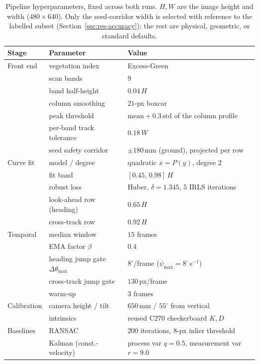 {\renewcommand{\arraystretch}{1.15}
\begin{table}[!ht]
  \centering
  \caption{Pipeline hyperparameters, fixed across both runs. $H,W$ are the image height and width
    ($480\times640$). Only the seed-corridor width is selected with reference to the labelled subset
    (Section~\ref{sec:res-accuracy}); the rest are physical, geometric, or standard defaults.}
  \label{tab:hyperparams}
  \begin{tabular}{lll}
    \hline
    \textbf{Stage} & \textbf{Parameter} & \textbf{Value} \\
    \hline
    Front end   & vegetation index            & Excess-Green \\
                & scan bands                  & $9$ \\
                & band half-height            & $0.04\,H$ \\
                & column smoothing            & $21$-px boxcar \\
                & peak threshold              & $\mathrm{mean}+0.3\,\mathrm{std}$ of the column profile \\
                & per-band track tolerance    & $0.18\,W$ \\
                & seed safety corridor        & $\pm180$\,mm (ground), projected per row \\
    \hline
    Curve fit   & model / degree              & quadratic $x=P(y)$, degree $2$ \\
                & fit band                    & $[0.45,\,0.98]\,H$ \\
                & robust loss                 & Huber, $\delta=1.345$, $5$ IRLS iterations \\
                & look-ahead row (heading)    & $0.65\,H$ \\
                & cross-track row             & $0.92\,H$ \\
    \hline
    Temporal    & median window               & $15$ frames \\
                & EMA factor $\beta$          & $0.4$ \\
                & heading jump gate $\Delta\theta_{\max}$ & $8^\circ$/frame ($\dot\psi_{\max}=8^\circ$\,s$^{-1}$) \\
                & cross-track jump gate       & $130$\,px/frame \\
                & warm-up                     & $3$ frames \\
    \hline
    Calibration & camera height / tilt        & $650$\,mm / $55^\circ$ from vertical \\
                & intrinsics                  & reused C270 checkerboard $K,D$ \\
    \hline
    Baselines   & RANSAC                      & $200$ iterations, $8$-px inlier threshold \\
                & Kalman (const.-velocity)    & process var $q=0.5$, measurement var $r=9.0$ \\
    \hline
  \end{tabular}
\end{table}}

